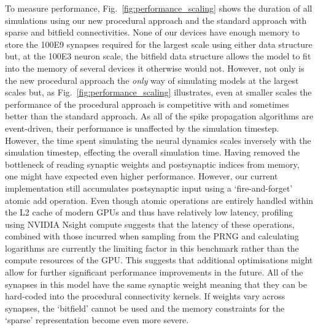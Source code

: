 \documentclass[9pt,a4paper]{amsart}
\begin{document}
To measure performance, Fig.~\ref{fig:performance_scaling} shows the duration of all simulations using our new procedural approach and the standard approach with sparse and bitfield connectivities. 
None of our devices have enough memory to store the \num{100E9} synapses required for the largest scale using either data structure but, at the \num{100E3} neuron scale, the bitfield data structure allows the model to fit into the memory of several devices it otherwise would not.
However, not only is the new procedural approach the \emph{only} way of simulating models at the largest scales but, as Fig.~\ref{fig:performance_scaling} illustrates, even at smaller scales the performance of the procedural approach is competitive with and sometimes better than the standard approach.
As all of the spike propagation algorithms are event-driven, their performance is unaffected by the simulation timestep.
However, the time spent simulating the neural dynamics scales inversely with the simulation timestep, effecting the overall simulation time.
Having removed the bottleneck of reading synaptic weights and postsynaptic indices from memory, one might have expected even higher performance. 
However, our current implementation still accumulates postsynaptic input using a `fire-and-forget' atomic add operation.
Even though atomic operations are entirely handled within the L2 cache of modern GPUs and thus have relatively low latency, profiling using NVIDIA Nsight compute suggests that the latency of these operations, combined with those incurred when sampling from the PRNG and calculating logarithms are currently the limiting factor in this benchmark rather than the compute resources of the GPU. This suggests that additional optimisations might allow for further significant performance improvements in the future.
All of the synapses in this model have the same synaptic weight meaning that they can be hard-coded into the procedural connectivity kernels.
If weights vary across synapses, the `bitfield' cannot be used and the memory constraints for the `sparse' representation become even more severe.
\end{document}
